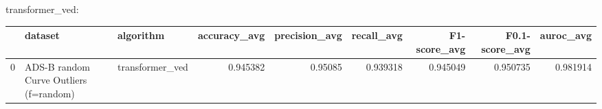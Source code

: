 transformer_ved:

\begin{tabular}{rllrrrrrr}
\hline
    & dataset                                & algorithm       &   accuracy\_avg &   precision\_avg &   recall\_avg &   F1-score\_avg &   F0.1-score\_avg &   auroc\_avg \\
\hline
  0 & ADS-B random Curve Outliers (f=random) & transformer\_ved &       0.945382 &         0.95085 &     0.939318 &       0.945049 &         0.950735 &    0.981914 \\
\hline
\end{tabular}

